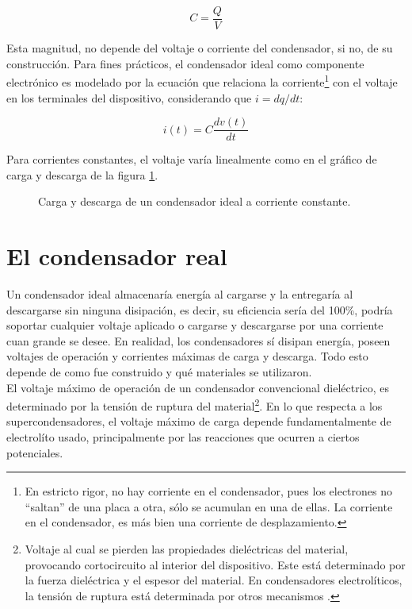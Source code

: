 \begin{equation}
	C = \frac{Q}{V}
\end{equation}

Esta magnitud, no depende del voltaje o corriente del condensador, si no, de su construcción. Para fines prácticos, el condensador ideal como componente electrónico es modelado por la ecuación que relaciona la corriente\footnote{En estricto rigor, no hay corriente en el condensador, pues los electrones no ``saltan'' de una placa a otra, sólo se acumulan en una de ellas. La corriente en el condensador, es más bien una corriente de desplazamiento.} con el voltaje en los terminales del dispositivo, considerando que $i = dq/dt$:

\begin{equation}
	i(t) = C \frac{dv(t)}{dt}
\end{equation}

Para corrientes constantes, el voltaje varía linealmente como en el gráfico de carga y descarga de la figura \ref{fig:plot:charge-discharge_ideal_cap}.
\begin{figure}[h!]
	\centering
	\caption{Carga y descarga de un condensador ideal a corriente constante.}
	\label{fig:plot:charge-discharge_ideal_cap}
\end{figure}

\section{El condensador real}
Un condensador ideal almacenaría energía al cargarse y la entregaría al descargarse sin ninguna disipación, es decir, su eficiencia sería del 100\%, podría soportar cualquier voltaje aplicado o cargarse y descargarse por una corriente cuan grande se desee.  En realidad, los condensadores sí disipan energía, poseen voltajes de operación y corrientes máximas de carga y descarga. Todo esto depende de como fue construido y qué materiales se utilizaron.\\
El voltaje máximo de operación de un condensador convencional dieléctrico, es determinado por la tensión de ruptura del material\footnote{Voltaje al cual se pierden las propiedades dieléctricas del material, provocando cortocircuito al interior del dispositivo. Este está determinado por la fuerza dieléctrica y el espesor del material. En condensadores electrolíticos, la tensión de ruptura está determinada por otros mecanismos \citep{Yahalom1971}.}. En lo que respecta a los supercondensadores, el voltaje máximo de carga depende fundamentalmente de electrolíto usado, principalmente por las reacciones que ocurren a ciertos potenciales.\\

